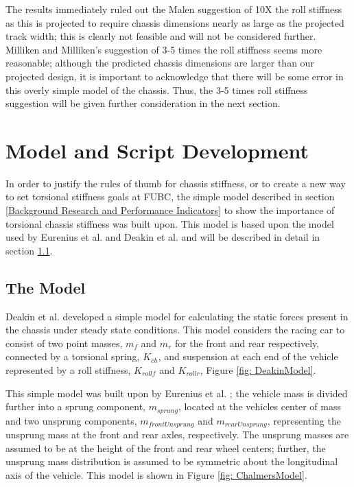 \documentclass[a4paper]{article}
\numberwithin{equation}{section}
\begin{document}
The results immediately ruled out the Malen suggestion of 10X the roll stiffness as this is projected to require chassis dimensions nearly as large as the projected track width; this is clearly not feasible and will not be considered further.  Milliken and Milliken’s suggestion of 3-5 times the roll stiffness seems more reasonable; although the predicted chassis dimensions are larger than our projected design, it is important to acknowledge that there will be some error in this overly simple model of the chassis. Thus, the 3-5 times roll stiffness suggestion will be given further consideration in the next section.

\section{Model and Script Development} \label{Model and Script Development}
In order to justify the rules of thumb for chassis stiffness, or to create a new way to set torsional stiffness goals at FUBC, the simple model described in section \ref{Background Research and Performance Indicators} to show the importance of torsional chassis stiffness was built upon. This model is based upon the model used by Eurenius et al. \cite{Chalmers} and Deakin et al. \cite{Deakin} and will be described in detail in section \ref{The Model}.

\subsection{The Model} \label{The Model}
Deakin et al. \cite{Deakin} developed a simple model for calculating the static forces present in the chassis under steady state conditions. This model considers the racing car to consist of two point masses, $m_f$ and $m_r$ for the front and rear respectively, connected by a torsional spring, $K_{ch}$, and suspension at each end of the vehicle represented by a roll stiffness, $K_{rollf}$ and $K_{rollr}$, Figure \ref{fig: DeakinModel}. 

This simple model was built upon by Eurenius et al. \cite{Chalmers}; the vehicle mass is divided further into a sprung component, $m_{sprung}$, located at the vehicles center of mass and two unsprung components, $m_{frontUnsprung}$ and $m_{rearUnsprung}$, representing the unsprung mass at the front and rear axles, respectively. The unsprung masses are assumed to be at the height of the front and rear wheel centers; further, the unsprung mass distribution is assumed to be symmetric about the longitudinal axis of the vehicle. This model is shown in Figure \ref{fig: ChalmersModel}.
\end{document}
